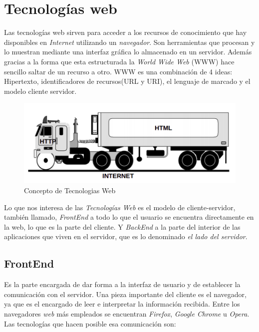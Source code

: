 \section{Tecnologías web}
\label{sec:web}
Las tecnologías web sirven para acceder a los recursos de conocimiento que hay disponibles en \textit{Internet} utilizando un \textit{navegador}. Son herramientas que procesan y lo muestran mediante una interfaz gráfica lo almacenado en un servidor. Además gracias a la forma que esta estructurada la \textit{World Wide Web} (WWW) hace sencillo saltar de un recurso a otro. 
WWW es una combinación de 4 ideas: Hipertexto, identificadores de recursos(URL y URI), el lenguaje de marcado y el modelo cliente servidor.

\begin{figure}[h]
\centering
\includegraphics[scale=0.4]{img/tecnologiasweb.png}
\caption{Concepto de Tecnologias Web} \label{fig:tecnologiasweb}
\end{figure}

Lo que nos interesa de las \textit{Tecnologías Web} es el modelo de cliente-servidor, también llamado, \textit{FrontEnd} a todo lo que el usuario se encuentra directamente en la web, lo que es la parte del cliente. Y \textit{BackEnd} a la parte del interior de las aplicaciones que viven en el servidor, que es lo denominado \textit{el lado del servidor}. 
\subsection{FrontEnd}
\label{subsec:frontend} 
Es la parte encargada de dar forma a la interfaz de usuario y de establecer la comunicación con el servidor. Una pieza importante del cliente es el navegador, ya que es el encargado de leer e interpretar la información recibida. Entre los navegadores \textit{web} más empleados se encuentran \textit{Firefox}, \textit{Google Chrome} u \textit{Opera}\cite{bib:navegadores}. Las tecnologías que hacen posible esa comunicación son: 

